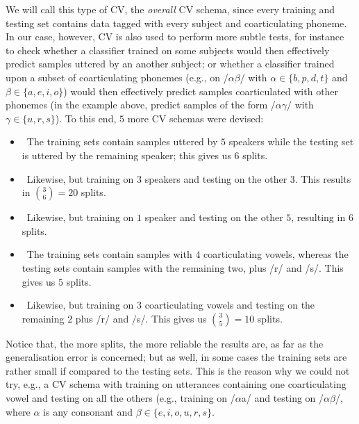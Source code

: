 We will call this type of CV, the \emph{overall} CV schema,
since every training and testing set contains data tagged with every subject and
coarticulating phoneme. In our case, however, CV is also used to perform more subtle
tests, for instance to check whether a classifier trained on some subjects would
then effectively predict samples uttered by an another subject; or whether a classifier
trained upon a subset of coarticulating phonemes (e.g., on /$\alpha\beta$/ with
$\alpha \in \{b,p,d,t\}$ and $\beta \in \{a,e,i,o\}$) would then effectively predict samples
coarticulated with other phonemes (in the example above, predict samples of the form
/$\alpha\gamma$/ with $\gamma \in \{u,r,s\}$). To this end, $5$ more CV schemas were devised:

\begin{itemize}

  \item \spka\ The training sets contain samples
  	uttered by $5$ speakers while the testing set is
  	uttered by the remaining speaker; this gives us $6$ splits.

  \item \spkb\ Likewise, but training on $3$ speakers and testing on the
  	other $3$. This results in $\binom{3}{6} = 20$ splits.

  \item \spkc\ Likewise, but training on $1$ speaker and testing on the
  	other $5$, resulting in $6$ splits.

  \item \coa\ The training sets contain samples
  	with $4$ coarticulating vowels, whereas the testing sets contain samples
  	with the remaining two, plus /r/ and /s/. This gives us $5$ splits.

  \item \cob\ Likewise, but training on $3$ coarticulating vowels and
  	testing on the remaining $2$ plus /r/ and /s/. This gives us
  	$\binom{3}{5} = 10$ splits.

\end{itemize}

Notice that, the more splits, the more reliable the results are, as far as the
generalisation error is concerned; but as well, in some cases the training sets
are rather small if compared to the testing sets. This is the reason why we could
not try, e.g., a CV schema with training on utterances containing
one coarticulating vowel and testing on all the others (e.g., training on
/$\alpha$a/ and testing on /$\alpha\beta$/, where $\alpha$ is any consonant
and $\beta \in \{e,i,o,u,r,s\}$.
